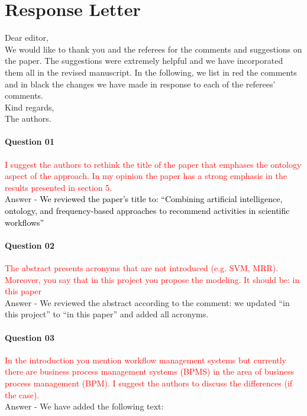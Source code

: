 \documentclass{report}
\begin{document}
	
\chapter*{Response Letter}

Dear editor,
\\
We would like to thank you and the referees for the comments and suggestions on the paper. The suggestions were extremely helpful and we have incorporated them all in the revised manuscript. In the following, we list in red the comments and in black the changes we have made in response to each of the referees' comments.
\\
Kind regards,
\\
The authors.


\subsubsection{Question 01}
\textcolor{red}{
I suggest the authors to rethink the title of the paper that emphases the ontology aspect of the approach. In my opinion the paper has a strong emphasis in the results presented in section 5.}
\\
Answer -  \textcolor{black}{We reviewed the paper's title to: ``Combining artificial intelligence, ontology, and frequency-based approaches to recommend activities in scientific workflows''}
	
\subsubsection{Question 02}
\textcolor{red}{The abstract presents acronyms that are not introduced (e.g. SVM, MRR).
Moreover, you say that in this project you propose the modeling. It should
be: in this paper}
\\
Answer -  We reviewed the abstract according to the comment: we updated ``in this project'' to ``in this paper'' and added all acronyms.

\subsubsection{Question 03}
\textcolor{red}{In the introduction you mention workflow management systems but currently
there are business process management systems (BPMS) in the area of business
process management (BPM). I suggest the authors to discuss the differences
(if the case).}
\\
Answer -  We have added the following text: 
\end{document}
